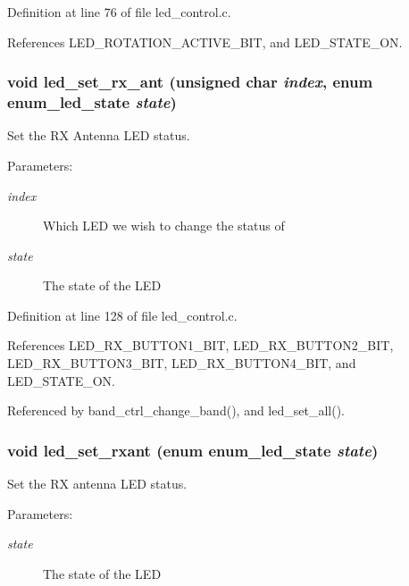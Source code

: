 Definition at line 76 of file led\_\-control.c.

References LED\_\-ROTATION\_\-ACTIVE\_\-BIT, and LED\_\-STATE\_\-ON.
\subsubsection[{led\_\-set\_\-rx\_\-ant}]{\setlength{\rightskip}{0pt plus 5cm}void led\_\-set\_\-rx\_\-ant (unsigned char {\em index}, \/  enum {\bf enum\_\-led\_\-state} {\em state})}\label{led__control_8c_5a7a9162c3fb5416a9c2f9608c88021b}


Set the RX Antenna LED status. 

\begin{Desc}
\item[Parameters:]
\begin{description}
\item[{\em index}]Which LED we wish to change the status of \item[{\em state}]The state of the LED \end{description}
\end{Desc}


Definition at line 128 of file led\_\-control.c.

References LED\_\-RX\_\-BUTTON1\_\-BIT, LED\_\-RX\_\-BUTTON2\_\-BIT, LED\_\-RX\_\-BUTTON3\_\-BIT, LED\_\-RX\_\-BUTTON4\_\-BIT, and LED\_\-STATE\_\-ON.

Referenced by band\_\-ctrl\_\-change\_\-band(), and led\_\-set\_\-all().
\subsubsection[{led\_\-set\_\-rxant}]{\setlength{\rightskip}{0pt plus 5cm}void led\_\-set\_\-rxant (enum {\bf enum\_\-led\_\-state} {\em state})}\label{led__control_8c_1842fb4da0f83f83c77493a3dd2ddfb8}


Set the RX antenna LED status. 

\begin{Desc}
\item[Parameters:]
\begin{description}
\item[{\em state}]The state of the LED \end{description}
\end{Desc}


